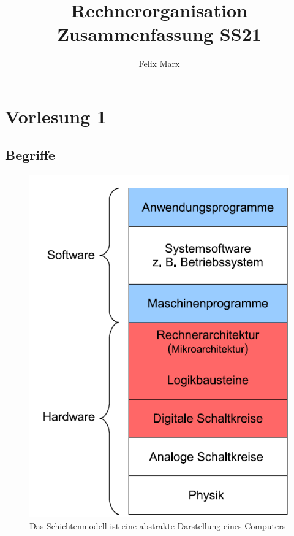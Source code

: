 \documentclass[a4paper,12pt,leqno]{article}
\title{Rechnerorganisation\\Zusammenfassung SS21}
\author{Felix Marx}
\begin{document}
\maketitle

{
\hypersetup{linkcolor=black}
\tableofcontents
}
\newpage

\section{Vorlesung 1}
\subsection{Begriffe}

\begin{figure}[h!]
\centering
\includegraphics[scale=0.4]{Grafiken/Schichtenmodell.png}
\caption{Das Schichtenmodell ist eine abstrakte Darstellung eines Computers}
\end{figure}
\end{document}
